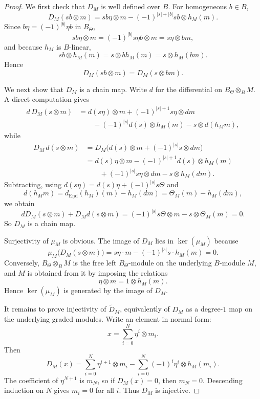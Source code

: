\begin{proof}
We first check that \(D_{M}\) is well defined over \(B\).
For homogeneous \(b\in B\),
\[
D_{M}(sb\otimes m)
=
sb\eta\otimes m-(-1)^{|s|+|b|}sb\otimes h_{M}(m).
\]
Since \(b\eta=(-1)^{|b|}\eta b\) in \(B_{\Theta}\),
\[
sb\eta\otimes m=(-1)^{|b|}s\eta b\otimes m=s\eta\otimes bm,
\]
and because \(h_{M}\) is \(B\)-linear,
\[
sb\otimes h_{M}(m)=s\otimes bh_{M}(m)=s\otimes h_{M}(bm).
\]
Hence
\[
D_{M}(sb\otimes m)=D_{M}(s\otimes bm).
\]

We next show that \(D_{M}\) is a chain map.
Write \(d\) for the differential on \(B_{\Theta}\otimes_{B}M\).
A direct computation gives
\begin{align*}
d\,D_{M}(s\otimes m)
&=
d(s\eta)\otimes m+(-1)^{|s|+1}s\eta\otimes dm
\\
&\qquad
-(-1)^{|s|}d(s)\otimes h_{M}(m)-s\otimes d(h_{M}m),
\end{align*}
while
\begin{align*}
D_{M}\,d(s\otimes m)
&=
D_{M}\big(d(s)\otimes m+(-1)^{|s|}s\otimes dm\big)
\\
&=
d(s)\eta\otimes m-(-1)^{|s|+1}d(s)\otimes h_{M}(m)
\\
&\qquad
+(-1)^{|s|}s\eta\otimes dm-s\otimes h_{M}(dm).
\end{align*}
Subtracting, using \(d(s\eta)=d(s)\eta+(-1)^{|s|}s\Theta\) and
\[
d(h_{M}m)=d_{\underline{\operatorname{End}}}(h_{M})(m)-h_{M}(dm)=\Theta_{M}(m)-h_{M}(dm),
\]
we obtain
\[
dD_{M}(s\otimes m)+D_{M}d(s\otimes m)=
(-1)^{|s|}s\Theta\otimes m-s\otimes \Theta_{M}(m)=0.
\]
So \(D_{M}\) is a chain map.

Surjectivity of \(\mu_{M}\) is obvious.
The image of \(D_{M}\) lies in \(\ker(\mu_{M})\) because
\[
\mu_{M}\big(D_{M}(s\otimes m)\big)
=s\eta\cdot m-(-1)^{|s|}s\cdot h_{M}(m)=0.
\]
Conversely, \(B_{\Theta}\otimes_{B}M\) is the free left \(B_{\Theta}\)-module on the underlying \(B\)-module \(M\), and \(M\) is obtained from it by imposing the relations
\[
\eta\otimes m=1\otimes h_{M}(m).
\]
Hence \(\ker(\mu_{M})\) is generated by the image of \(D_{M}\).

It remains to prove injectivity of \(\widetilde D_{M}\), equivalently of \(D_{M}\) as a degree-\(1\) map on the underlying graded modules.
Write an element in normal form:
\[
x=\sum_{i=0}^{N}\eta^{i}\otimes m_{i}.
\]
Then
\[
D_{M}(x)=\sum_{i=0}^{N}\eta^{i+1}\otimes m_{i}-\sum_{i=0}^{N}(-1)^{i}\eta^{i}\otimes h_{M}(m_{i}).
\]
The coefficient of \(\eta^{N+1}\) is \(m_{N}\), so if \(D_{M}(x)=0\), then \(m_{N}=0\).
Descending induction on \(N\) gives \(m_{i}=0\) for all \(i\).
Thus \(D_{M}\) is injective.
\end{proof}

